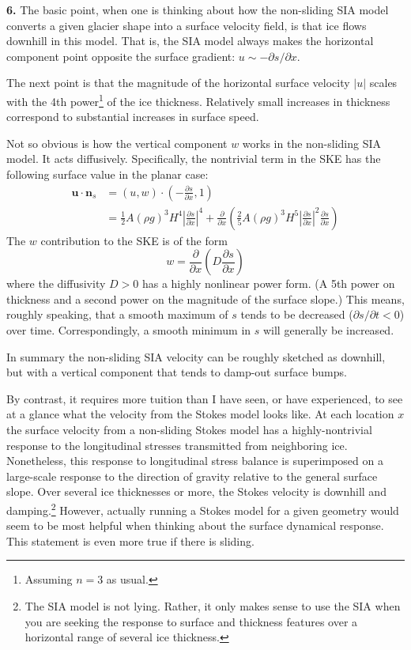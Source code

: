 \documentclass[12pt]{amsart}
\newcommand{\bn}{\mathbf{n}}
\newcommand{\bu}{\mathbf{u}}
\newcommand{\prob}[1]{\bigskip\noindent\textbf{#1.}\quad }
\begin{document}
\prob{6}  The basic point, when one is thinking about how the non-sliding SIA model converts a given glacier shape into a surface velocity field, is that ice flows downhill in this model.  That is, the SIA model always makes the horizontal component point opposite the surface gradient: $u \sim - \partial s/\partial x$.

The next point is that the magnitude of the horizontal surface velocity $|u|$ scales with the 4th power\footnote{Assuming $n=3$ as usual.} of the ice thickness.  Relatively small increases in thickness correspond to substantial increases in surface speed.

Not so obvious is how the vertical component $w$ works in the non-sliding SIA model.  It acts diffusively.  Specifically, the nontrivial term in the SKE has the following surface value in the planar case:
\begin{align*}
\bu \cdot \bn_s &= \left(u,w\right) \cdot \left(-\frac{\partial s}{\partial x},1\right) \\
    &= \frac{1}{2}  A (\rho g)^3 H^{4} \left|\frac{\partial s}{\partial x}\right|^{4} + \frac{\partial}{\partial x} \left(\frac{2}{5}  A (\rho g)^3 H^{5} \left|\frac{\partial s}{\partial x}\right|^{2} \frac{\partial s}{\partial x}\right)
\end{align*}
The $w$ contribution to the SKE is of the form
	$$w = \frac{\partial}{\partial x} \left(D \frac{\partial s}{\partial x}\right)$$
where the diffusivity $D>0$ has a highly nonlinear power form.  (A 5th power on thickness and a second power on the magnitude of the surface slope.)  This means, roughly speaking, that a smooth maximum of $s$ tends to be decreased ($\partial s/\partial t < 0$) over time.  Correspondingly, a smooth minimum in $s$ will generally be increased.

In summary the non-sliding SIA velocity can be roughly sketched as downhill, but with a vertical component that tends to damp-out surface bumps.

By contrast, it requires more tuition than I have seen, or have experienced, to see at a glance what the velocity from the Stokes model looks like.  At each location $x$ the surface velocity from a non-sliding Stokes model has a highly-nontrivial response to the longitudinal stresses transmitted from neighboring ice.  Nonetheless, this response to longitudinal stress balance is superimposed on a large-scale response to the direction of gravity relative to the general surface slope.  Over several ice thicknesses or more, the Stokes velocity is downhill and damping.\footnote{The SIA model is not lying.  Rather, it only makes sense to use the SIA when you are seeking the response to surface and thickness features over a horizontal range of several ice thickness.}  However, actually running a Stokes model for a given geometry would seem to be most helpful when thinking about the surface dynamical response.  This statement is even more true if there is sliding.
\end{document}
